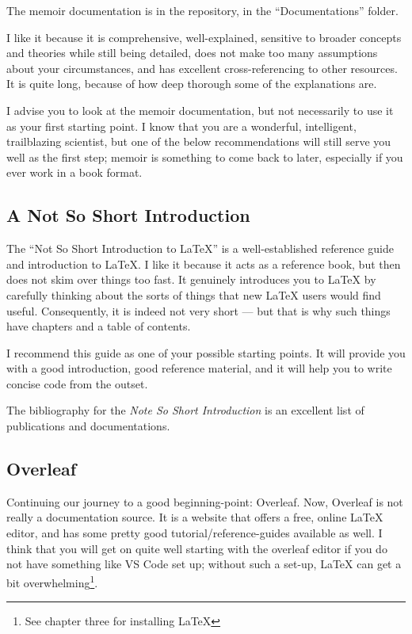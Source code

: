 \documentclass[11pt, oneside]{memoir}
\begin{document}
The memoir documentation is in the repository, in the  ``Documentations'' folder. 

I like it because it is comprehensive, well-explained, sensitive to broader concepts and theories while still being detailed, does not make too many assumptions about your circumstances, and has excellent cross-referencing to other resources. It is quite long, because of how deep thorough some of the explanations are.

I advise you to look at the memoir documentation, but not necessarily to use it as your first starting point. I know that you are a wonderful, intelligent, trailblazing scientist, but one of the below recommendations will still serve you well as the first step; memoir is something to come back to later, especially if you ever work in a book format.

\subsection{A Not So Short Introduction}

The ``Not So Short Introduction to LaTeX'' is a well-established reference guide and introduction to LaTeX. I like it because it acts as a reference book, but then does not skim over things too fast. It genuinely introduces you to LaTeX by carefully thinking about the sorts of things that new LaTeX users would find useful. Consequently, it is indeed not very short — but that is why such things have chapters and a table of contents.

I recommend this guide as one of your possible starting points. It will provide you with a good introduction, good reference material, and it will help you to write concise code from the outset.

The bibliography for the \emph{Note So Short Introduction} is an excellent list of publications and documentations.

\subsection{Overleaf}

Continuing our journey to a good beginning-point: Overleaf. Now, Overleaf is not really a documentation source. It is a website that offers a free, online LaTeX editor, and has some pretty good tutorial/reference-guides available as well. I think that you will get on quite well starting with the overleaf editor if you do not have something like VS Code set up; without such a set-up, LaTeX can get a bit overwhelming\footnote{See chapter three for installing LaTeX}.
\end{document}
